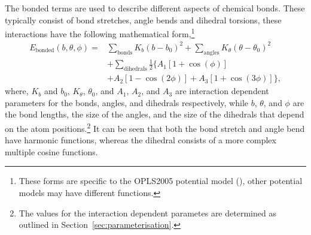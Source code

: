 The bonded terms are used to describe different aspects of chemical bonds.
These typically consist of bond stretches, angle bends and dihedral torsions, these interactions have the following mathematical form,\footnote{These forms are specific to the OPLS2005 potential model (\cite{banks_integrated_2005}), other potential models may have different functions.}
%
\begin{equation}
\begin{aligned}
  E_{\text{bonded}}(b, \theta, \phi) = & \sum_{\text{bonds}}K_b(b-b_0)^2 + \sum_{\text{angles}}K_{\theta}(\theta-\theta_0)^2 \\
  & + \sum_{\text{dihedrals}} \frac{1}{2}\big\{A_1[1 + \cos(\phi)] \\
  & + A_2[1 - \cos(2\phi)] + A_3[1 + \cos(3\phi)]\big\},
\end{aligned}
\end{equation}
%
where, $K_b$ and $b_0$, $K_{\theta}$, $\theta_0$, and $A_1$, $A_2$, and $A_3$ are interaction dependent parameters for the bonds, angles, and dihedrals respectively, while $b$, $\theta$, and $\phi$ are the bond lengths, the size of the angles, and the size of the dihedrals that depend on the atom positions.\footnote{The values for the interaction dependent parametes are determined as outlined in Section~\protect\ref{sec:parameterisation}.}
It can be seen that both the bond stretch and angle bend have harmonic functions, whereas the dihedral consists of a more complex multiple cosine functions.


